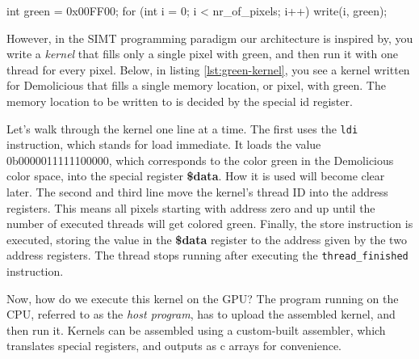 \documentclass[../main/report.tex]{subfiles}
\begin{document}
\begin{c-code}[caption=A sequential program filling the screen with green, label=sequential-green]
int green = 0x00FF00;
for (int i = 0; i < nr_of_pixels; i++){
    write(i, green);
}
\end{c-code}

However, in the SIMT programming paradigm our architecture is inspired by,
you write a \emph{kernel} that fills only a single pixel with green, 
and then run it with one thread for every pixel.
Below, in listing \ref{lst:green-kernel}, 
you see a kernel written for Demolicious that fills a single memory location,
or pixel, with green.
The memory location to be written to is decided by the special id register. 



Let's walk through the kernel one line at a time.
The first uses the \verb/ldi/ instruction, which stands for load immediate.
It loads the value 0b0000011111100000,
which corresponds to the color green in the Demolicious color space,
into the special register \textbf{\$data}.
How it is used will become clear later.
The second and third line move the kernel's thread ID into the address registers.
This means all pixels starting with address zero and up until the number of executed threads
will get colored green.
Finally, the store instruction is executed, storing the value in the \textbf{\$data} register
to the address given by the two address registers.
The thread stops running after executing the \verb/thread_finished/ instruction.

Now, how do we execute this kernel on the GPU?
The program running on the CPU, referred to as the \emph{host program},
has to upload the assembled kernel, and then run it.
Kernels can be assembled using a custom-built assembler,
which translates special registers, and outputs as c arrays for convenience.

\end{document}
